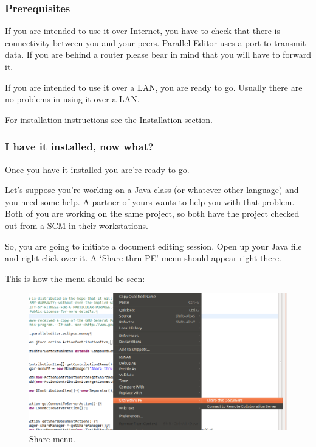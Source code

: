 \subsubsection{Prerequisites}

If you are intended to use it over Internet, you have to check that there is connectivity between
you and your peers. Parallel Editor uses a port to transmit data. If you are behind a router 
please bear in mind that you will have to forward it.


If you are intended to use it over a LAN, you are ready to go. Usually there are no problems in
using it over a LAN.

For installation instructions see the Installation section. %

\subsubsection{I have it installed, now what?}

Once you have it installed you are're ready to go.

Let's suppose you're working on a Java class (or whatever other language) and you need some help. A 
partner of yours wants to help you with that problem. Both of you are working on the same project, so
both have the project checked out from a SCM in their workstations.

So, you are going to initiate a document editing session. Open up your Java file and right click over it. 
A `Share thru PE' menu should appear right there.

This is how the menu should be seen: 
\begin{figure}[!ht]
	\begin{center}
		\includegraphics[width=14cm]{contextual_menu.png}
		\caption{\label{share} Share menu.}
	\end{center}
\end{figure}

